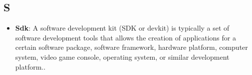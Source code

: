 \subsection*{S}
\begin{itemize}
	\item
	\textbf{Sdk}: A software development kit (SDK or devkit) is typically a set of software development tools that allows the creation of applications for a certain software package, software framework, hardware platform, computer system, video game console, operating system, or similar development platform..
\end{itemize}
\newpage